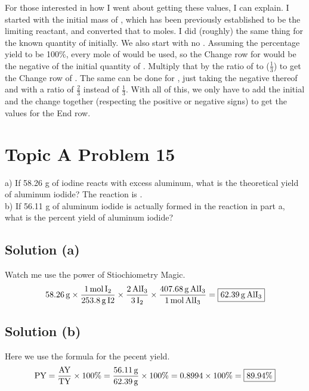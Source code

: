 \documentclass[10pt]{article}
\begin{document}
            For those interested in how I went about getting these values, I can explain.
            I started with the initial mass of , which has been previously established to be the limiting reactant, and converted that to moles.
            I did (roughly) the same thing for the known quantity of  initially.
            We also start with no .
            Assuming the percentage yield to be 100\%, every mole of  would be used, so the Change row for  would be the negative of the initial quantity of .
            Multiply that by the ratio of  to  ($\frac{1}{3}$) to get the Change row of .
            The same can be done for , just taking the negative thereof and with a ratio of $\frac{2}{3}$ instead of $\frac{1}{3}$.
            With all of this, we only have to add the initial and the change together (respecting the positive or negative signs) to get the values for the End row.

    \pagebreak
    \section{Topic A Problem 15}
        a) If 58.26 g of iodine reacts with excess aluminum, what is the theoretical yield of aluminum iodide? 
        The reaction is .\\
        b) If 56.11 g of aluminum iodide is actually formed in the reaction in part a, what is the percent yield of aluminum iodide?

        \subsection{Solution (a)}
            Watch me use the power of Stiochiometry Magic.
            \begin{equation}
                58.26\,\unit{\gram} \times  \frac{1\,\unit{\mole}\,\ce{I2}}{253.8\,\unit{\gram}\,\unit{I2}}
                                    \times  \frac{2\,\ce{AlI3}}{3\,\ce{I2}}
                                    \times  \frac{407.68\,\unit{\gram}\,\ce{AlI3}}{1\,\unit{\mole}\,\ce{AlI3}}
                    =   \boxed{62.39\,\unit{\gram}\,\ce{AlI3}}
            \end{equation}
        
        \subsection{Solution (b)}
            Here we use the formula for the pecent yield.
            \begin{equation}
                \text{PY}   =   \frac{\rm AY}{\rm TY}   \times  100\%
                    =   \frac{56.11\,\unit{\gram}}{62.39\,\unit{\gram}} \times  100\%
                    =   0.8994 \times 100\%
                    =   \boxed{89.94\%}
            \end{equation}
        
\end{document}
